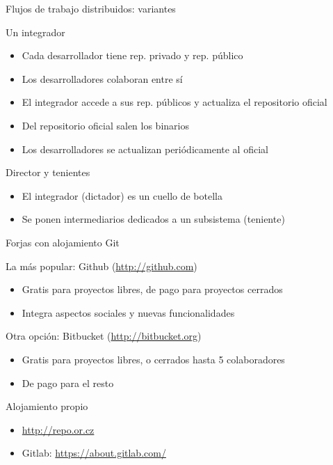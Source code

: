 \documentclass[xcolor=svgnames]{beamer}
\begin{document}
\fi

\begin{frame}{Flujos de trabajo distribuidos: variantes}

  \begin{block}{Un integrador}
    \begin{itemize}
    \item Cada desarrollador tiene rep. privado y rep. público
    \item Los desarrolladores colaboran entre sí
    \item El integrador accede a sus rep. públicos y actualiza el
      repositorio oficial
    \item Del repositorio oficial salen los binarios
    \item Los desarrolladores se actualizan periódicamente al oficial
    \end{itemize}
  \end{block}

  \begin{block}{Director y tenientes}
    \begin{itemize}
    \item El integrador (dictador) es un cuello de botella
    \item Se ponen intermediarios dedicados a un subsistema (teniente)
    \end{itemize}
  \end{block}

\end{frame}

\begin{frame}{Forjas con alojamiento Git}

  \begin{block}{La más popular: Github (\url{http://github.com})}
    \begin{itemize}
    \item Gratis para proyectos libres, de pago para proyectos cerrados
    \item Integra aspectos sociales y nuevas funcionalidades
    \end{itemize}
  \end{block}

  \begin{block}{Otra opción: Bitbucket (\url{http://bitbucket.org})}
    \begin{itemize}
    \item Gratis para proyectos libres, o cerrados hasta 5 colaboradores
    \item De pago para el resto
    \end{itemize}
  \end{block}

  \begin{block}{Alojamiento propio}
    \begin{itemize}
    \item \url{http://repo.or.cz}
    \item Gitlab: \url{https://about.gitlab.com/}
    \end{itemize}
  \end{block}

\end{frame}
\end{document}
